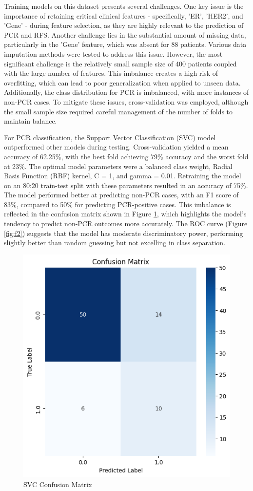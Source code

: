 \documentclass{article}
\begin{document}
Training models on this dataset presents several challenges. One key issue is the importance of retaining critical clinical features - specifically, 'ER', 'HER2', and 'Gene' - during feature selection, as they are highly relevant to the prediction of PCR and RFS. Another challenge lies in the substantial amount of missing data, particularly in the 'Gene' feature, which was absent for 88 patients. Various data imputation methods were tested to address this issue. However, the most significant challenge is the relatively small sample size of 400 patients coupled with the large number of features. This imbalance creates a high risk of overfitting, which can lead to poor generalization when applied to unseen data. Additionally, the class distribution for PCR is imbalanced, with more instances of non-PCR cases. To mitigate these issues, cross-validation was employed, although the small sample size required careful management of the number of folds to maintain balance.

For PCR classification, the Support Vector Classification (SVC) model outperformed other models during testing. Cross-validation yielded a mean accuracy of 62.25\%, with the best fold achieving 79\% accuracy and the worst fold at 23\%. The optimal model parameters were a balanced class weight, Radial Basis Function (RBF) kernel, C = 1, and gamma = 0.01. Retraining the model on an 80:20 train-test split with these parameters resulted in an accuracy of 75\%. The model performed better at predicting non-PCR cases, with an F1 score of 83\%, compared to 50\% for predicting PCR-positive cases. This imbalance is reflected in the confusion matrix shown in Figure \ref{fig:f1}, which highlights the model's tendency to predict non-PCR outcomes more accurately. The ROC curve (Figure \ref{fig:f2}) suggests that the model has moderate discriminatory power, performing slightly better than random guessing but not excelling in class separation.

\begin{figure}
  \centering
  \includegraphics[width=0.75\linewidth]{cm.png}
  \caption{SVC Confusion Matrix}
  \label{fig:f1}
\end{figure}
\end{document}
